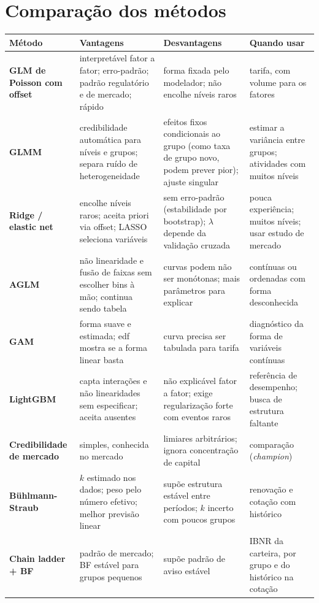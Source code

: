 \documentclass[11pt,a4paper]{article}
\begin{document}
\section{Comparação dos métodos}\label{sec:comparacao}

{\small
\begin{longtable}{@{}>{\raggedright\arraybackslash}p{}>{\raggedright\arraybackslash}p{}%
  >{\raggedright\arraybackslash}p{}>{\raggedright\arraybackslash}p{}@{}}
\toprule
Método & Vantagens & Desvantagens & Quando usar \\
\midrule\endhead
\textbf{GLM de Poisson com offset} & interpretável fator a fator; erro-padrão; padrão regulatório e de mercado; rápido
  & forma fixada pelo modelador; não encolhe níveis raros & tarifa, com volume para os fatores \\
\textbf{GLMM} & credibilidade automática para níveis e grupos; separa ruído de heterogeneidade
  & efeitos fixos condicionais ao grupo (como taxa de grupo novo, podem prever pior); ajuste singular
  & estimar a variância entre grupos; atividades com muitos níveis \\
\textbf{Ridge / elastic net} & encolhe níveis raros; aceita priori via offset; LASSO seleciona variáveis
  & sem erro-padrão (estabilidade por bootstrap); $\lambda$ depende da validação cruzada
  & pouca experiência; muitos níveis; usar estudo de mercado \\
\textbf{AGLM} & não linearidade e fusão de faixas sem escolher bins à mão; continua sendo tabela
  & curvas podem não ser monótonas; mais parâmetros para explicar & contínuas ou ordenadas com forma desconhecida \\
\textbf{GAM} & forma suave e estimada; edf mostra se a forma linear basta & curva precisa ser tabulada para tarifa
  & diagnóstico da forma de variáveis contínuas \\
\textbf{LightGBM} & capta interações e não linearidades sem especificar; aceita ausentes
  & não explicável fator a fator; exige regularização forte com eventos raros
  & referência de desempenho; busca de estrutura faltante \\
\textbf{Credibilidade de mercado} & simples, conhecida no mercado & limiares arbitrários; ignora concentração de capital
  & comparação (\emph{champion}) \\
\textbf{Bühlmann-Straub} & $k$ estimado nos dados; peso pelo número efetivo; melhor previsão linear
  & supõe estrutura estável entre períodos; $k$ incerto com poucos grupos & renovação e cotação com histórico \\
\textbf{Chain ladder + BF} & padrão de mercado; BF estável para grupos pequenos & supõe padrão de aviso estável
  & IBNR da carteira, por grupo e do histórico na cotação \\
\bottomrule
\end{longtable}
}
\end{document}
